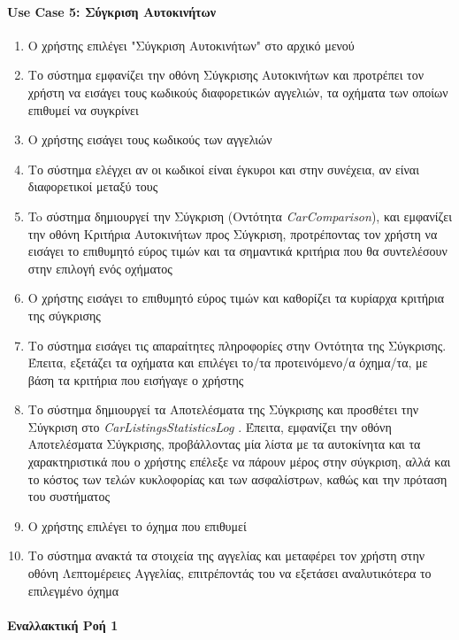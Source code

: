 \documentclass{../ol-softwaremanual}
\begin{document}
	\paragraph{\en Use Case 5: \gr Σύγκριση Αυτοκινήτων}
	\begin{enumerate}
		\item Ο χρήστης επιλέγει \en"\gr Σύγκριση Αυτοκινήτων\en" \gr στο αρχικό μενού
		\item Το σύστημα εμφανίζει την οθόνη Σύγκρισης Αυτοκινήτων και προτρέπει τον χρήστη να εισάγει τους κωδικούς διαφορετικών αγγελιών, τα οχήματα των οποίων επιθυμεί να συγκρίνει
		\item Ο χρήστης εισάγει τους κωδικούς των αγγελιών
		\item Το σύστημα ελέγχει αν οι κωδικοί είναι έγκυροι και στην συνέχεια, αν είναι διαφορετικοί μεταξύ τους
		\item To σύστημα δημιουργεί την Σύγκριση (Οντότητα \en \textit{CarComparison}\gr),  και εμφανίζει την οθόνη Κριτήρια Αυτοκινήτων προς Σύγκριση, προτρέποντας τον χρήστη να εισάγει το επιθυμητό εύρος τιμών και τα σημαντικά κριτήρια που θα συντελέσουν στην επιλογή ενός οχήματος
		\item Ο χρήστης εισάγει το επιθυμητό εύρος τιμών και καθορίζει τα κυρίαρχα κριτήρια της σύγκρισης
		\item Το σύστημα εισάγει τις απαραίτητες πληροφορίες στην Οντότητα της Σύγκρισης. Έπειτα, εξετάζει τα οχήματα και επιλέγει το/τα προτεινόμενο/α όχημα/τα, με βάση τα κριτήρια που εισήγαγε ο χρήστης
		\item Το σύστημα δημιουργεί τα Αποτελέσματα της Σύγκρισης και προσθέτει την Σύγκριση στο \en \textit{CarListingsStatisticsLog} \gr. Έπειτα, εμφανίζει την οθόνη Αποτελέσματα Σύγκρισης, προβάλλοντας μία λίστα με τα αυτοκίνητα και τα χαρακτηριστικά που ο χρήστης επέλεξε να πάρουν μέρος στην σύγκριση, αλλά και το κόστος των τελών κυκλοφορίας και των ασφαλίστρων, καθώς και την πρόταση του συστήματος 
		\item Ο χρήστης επιλέγει το όχημα που επιθυμεί
		\item Το σύστημα ανακτά τα στοιχεία της αγγελίας και μεταφέρει τον χρήστη στην οθόνη Λεπτομέρειες Αγγελίας, επιτρέποντάς του να εξετάσει αναλυτικότερα το επιλεγμένο όχημα
	\end{enumerate}
	
	\paragraph{Εναλλακτική Ροή 1}
	
\end{document}
